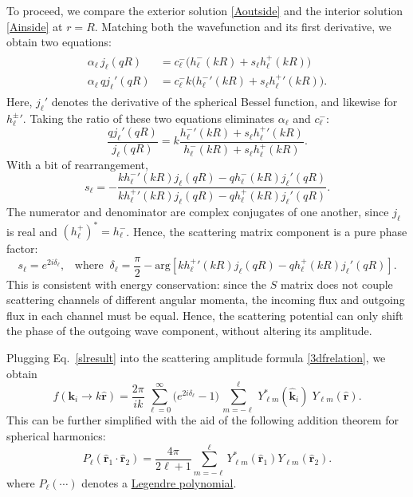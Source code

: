 \documentclass[pra,12pt]{revtex4-2}
\begin{document}
To proceed, we compare the exterior solution \eqref{Aoutside} and the
interior solution \eqref{Ainside} at $r = R$.  Matching both the
wavefunction and its first derivative, we obtain two equations:
\begin{align}
  \begin{aligned} \alpha_\ell\, j_\ell(qR) &= c^-_\ell \Big(h^-_\ell(kR) + s_\ell h^+_\ell(kR)\Big) \\ \alpha_\ell\, q j_\ell'(qR) &= c^-_\ell k \Big({h^-_\ell}'(kR) + s_\ell {h^+_\ell}'(kR)\Big).\end{aligned}
\end{align}
Here, $j_\ell'$ denotes the derivative of the spherical Bessel
function, and likewise for ${h_\ell^\pm}'$.  Taking the ratio of these
two equations eliminates $\alpha_\ell$ and $c_\ell^-$:
\begin{equation}
  \frac{q j_\ell'(qR)}{j_\ell(qR)} = k \frac{{h^-_\ell}'(kR) + s_\ell {h^+_\ell}'(kR)}{h^-_\ell(kR) + s_\ell h^+_\ell(kR)}.
\end{equation}
With a bit of rearrangement,
\begin{equation}
  s_\ell = - \frac{k{h_\ell^-}'(kR) j_\ell(qR) - qh_\ell^-(kR)j_\ell'(qR)}{k{h_\ell^+}'(kR) j_\ell(qR) - qh_\ell^+(kR)j_\ell'(qR)}.
\end{equation}
The numerator and denominator are complex conjugates of one another,
since $j_\ell$ is real and $(h_\ell^+)^* = h_\ell^-$.  Hence, the
scattering matrix component is a pure phase factor:
\begin{equation}
  s_\ell = e^{2i\delta_\ell}, \;\;\;\mathrm{where}\;\; \delta_\ell = \frac{\pi}{2} - \mathrm{arg}\!\left[k{h_\ell^+}'(kR) j_\ell(qR) - qh_\ell^+(kR)j_\ell'(qR)\right].
  \label{slresult}
\end{equation}
This is consistent with energy conservation: since the $S$ matrix does
not couple scattering channels of different angular momenta, the
incoming flux and outgoing flux in each channel must be equal.  Hence,
the scattering potential can only shift the phase of the outgoing wave
component, without altering its amplitude.

Plugging Eq.~\eqref{slresult} into the scattering amplitude formula
\eqref{3dfrelation}, we obtain
\begin{equation}
  f(\mathbf{k}_i\rightarrow k\hat{\mathbf{r}}) = \frac{2 \pi}{ik}\, \sum_{\ell =0}^\infty \big(e^{2i\delta_\ell} - 1\big) \, \sum_{m=-\ell}^\ell \,Y_{\ell m}^*(\hat{\mathbf{k}}_i)\; Y_{\ell m}(\hat{\mathbf{r}}).
\end{equation}
This can be further simplified with the aid of the following addition
theorem for spherical harmonics:
\begin{equation}
  P_\ell(\hat{\mathbf{r}}_1\cdot\hat{\mathbf{r}}_2) = \frac{4\pi}{2\ell+1} \sum_{m=-\ell}^{\ell} Y_{\ell m}^*(\hat{\mathbf{r}}_1) Y_{\ell m}(\hat{\mathbf{r}}_2).
\end{equation}
where $P_\ell(\cdots)$ denotes a
\href{https://en.wikipedia.org/wiki/Legendre_polynomials}{Legendre
  polynomial}.
\end{document}
